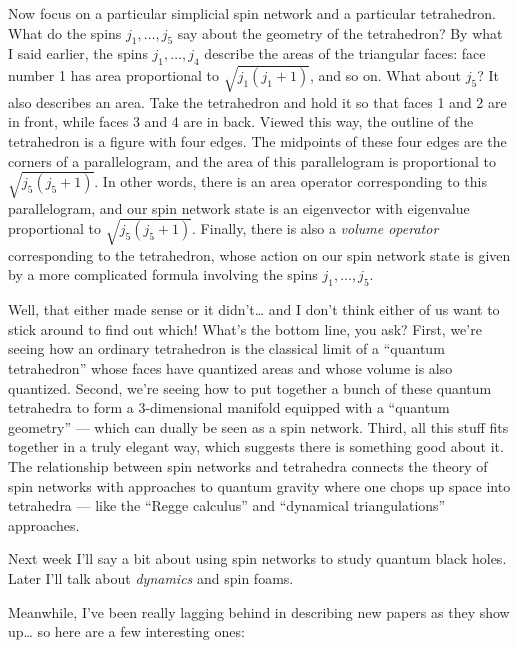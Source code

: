\documentclass{article}
\renewcommand{\texttt}[1]{%
  \begingroup
  \ttfamily
  \begingroup\lccode`~=`/\lowercase{\endgroup\def~}{/\discretionary{}{}{}}%
  \begingroup\lccode`~=`[\lowercase{\endgroup\def~}{[\discretionary{}{}{}}%
  \begingroup\lccode`~=`.\lowercase{\endgroup\def~}{.\discretionary{}{}{}}%
  \catcode`/=\active\catcode`[=\active\catcode`.=\active
  \scantokens{#1\noexpand}%
  \endgroup
}
\begin{document}
Now focus on a particular simplicial spin network and a particular
tetrahedron. What do the spins \(j_1,\ldots,j_5\) say about the geometry
of the tetrahedron? By what I said earlier, the spins \(j_1,\ldots,j_4\)
describe the areas of the triangular faces: face number 1 has area
proportional to \(\sqrt{j_1(j_1+1)}\), and so on. What about \(j_5\)? It
also describes an area. Take the tetrahedron and hold it so that faces 1
and 2 are in front, while faces 3 and 4 are in back. Viewed this way,
the outline of the tetrahedron is a figure with four edges. The
midpoints of these four edges are the corners of a parallelogram, and
the area of this parallelogram is proportional to \(\sqrt{j_5(j_5+1)}\).
In other words, there is an area operator corresponding to this
parallelogram, and our spin network state is an eigenvector with
eigenvalue proportional to \(\sqrt{j_5(j_5+1)}\). Finally, there is also
a \emph{volume operator} corresponding to the tetrahedron, whose action
on our spin network state is given by a more complicated formula
involving the spins \(j_1,\ldots,j_5\).

Well, that either made sense or it didn't\ldots{} and I don't think
either of us want to stick around to find out which! What's the bottom
line, you ask? First, we're seeing how an ordinary tetrahedron is the
classical limit of a ``quantum tetrahedron'' whose faces have quantized
areas and whose volume is also quantized. Second, we're seeing how to
put together a bunch of these quantum tetrahedra to form a 3-dimensional
manifold equipped with a ``quantum geometry'' --- which can dually be
seen as a spin network. Third, all this stuff fits together in a truly
elegant way, which suggests there is something good about it. The
relationship between spin networks and tetrahedra connects the theory of
spin networks with approaches to quantum gravity where one chops up
space into tetrahedra --- like the ``Regge calculus'' and ``dynamical
triangulations'' approaches.

Next week I'll say a bit about using spin networks to study quantum
black holes. Later I'll talk about \emph{dynamics} and spin foams.

Meanwhile, I've been really lagging behind in describing new papers as
they show up\ldots{} so here are a few interesting ones:

\end{document}

